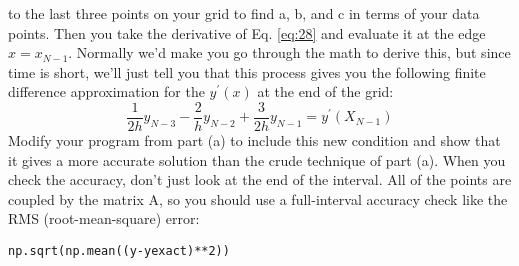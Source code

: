 \begin{problem}
\begin{enumerate}[label=(\alph*)]
	to the last three points on your grid to find a, b, and c in terms of your data points. Then you take the derivative of Eq. \ref{eq:28} and evaluate it at
the edge $x = x_{N−1}$. Normally we\rq d make you go through the math to
derive this, but since time is short, we\rq ll just tell you that this process
gives you the following finite difference approximation for the $y^\prime(x)$ at
the end of the grid:
	\begin{equation}\label{eq:210}
		\frac{1}{2h} y_{N-3} - \frac{2}{h} y_{N-2} + \frac{3}{2h} y_{N-1} = y^\prime(X_{N-1})
	\end{equation}
Modify your program from part (a) to include this new condition and
show that it gives a more accurate solution than the crude technique of
part (a). When you check the accuracy, don\rq t just look at the end of the
interval. All of the points are coupled by the matrix A, so you should
use a full-interval accuracy check like the RMS (root-mean-square)
error:
\begin{lstlisting}
np.sqrt(np.mean((y-yexact)**2))
\end{lstlisting}
\end{enumerate}
\end{problem}


